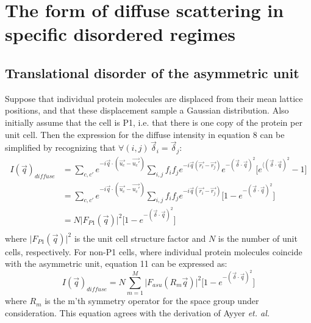 \documentclass{article}
\begin{document}
\section{The form of diffuse scattering in specific disordered regimes}

\subsection{Translational disorder of the asymmetric unit} Suppose that individual protein molecules are displaced from their mean lattice positions, and that these displacement sample a Gaussian distribution. Also initially assume that the cell is P1, i.e. that there is one copy of the protein per unit cell. Then the expression for the diffuse intensity in equation 8 can be simplified by recognizing that $\forall(i,j) \, \vec{\delta}_i = \vec{\delta}_j$:
\begin{equation}
\begin{aligned}
I(\vec{q})_{diffuse} & = \sum\limits_{c,c'} e^{-i \vec{q} \cdot (\vec{u_c} - \vec{u_c'})} \sum\limits_{i,j} f_i f_j e^{-i \vec{q} (\vec{r_i} - \vec{r_j})} e^{-(\vec{\delta} \cdot \vec{q})^2} \lbrack e^{\langle ( \vec{\delta} \cdot \vec{q} )^2 } - 1 \rbrack \\
& = \sum\limits_{c,c'} e^{-i \vec{q} \cdot (\vec{u_c} - \vec{u_c'})} \sum\limits_{i,j} f_i f_j e^{-i \vec{q} (\vec{r_i} - \vec{r_j})} \lbrack 1 - e^{ - ( \vec{\delta} \cdot \vec{q} )^2 } \rbrack \\
& = N \vert F_{P1}(\vec{q}) \vert ^2 \lbrack 1 - e^{ - ( \vec{\delta} \cdot \vec{q} )^2 } \rbrack \\
\end{aligned}
\end{equation}
where $\vert F_{P1}(\vec{q}) \vert ^2$ is the unit cell structure factor and $N$ is the number of unit cells, respectively. For non-P1 cells, where individual protein molecules coincide with the asymmetric unit, equation 11 can be expressed as:
\begin{equation}
I(\vec{q})_{diffuse} = N \sum\limits_{m=1}^M \vert F_{asu}(R_m\vec{q}) \vert ^2 \lbrack 1 - e^{ - ( \vec{\delta} \cdot \vec{q} )^2 } \rbrack
\end{equation}
where $R_m$ is the m'th symmetry operator for the space group under consideration. This equation agrees with the derivation of Ayyer \textit{et. al.} \cite{pmid26863980}
\end{document}
